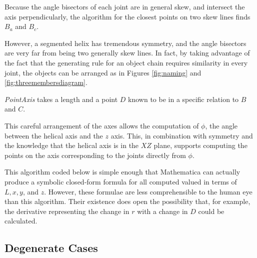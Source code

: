 \documentclass[11pt]{article}
\begin{document}
{Because the angle bisectors of each joint are in general skew, and intersect the
axis perpendicularly, the algorithm
for the closest points on two skew lines finds $B_a$ and $B_c$.

However, a segmented helix has
tremendous symmetry, and the angle bisectors are very far from being two
generally skew lines. In fact, by taking advantage of the fact that the
generating rule for an object chain requires similarity in every joint,
the objects can be arranged as in Figures \ref{fig:naming} and \ref{fig:threemembersdiagram}.

{\em PointAxis} takes a length and a point $D$ known to be in
a specific relation to $B$ and $C$.

This careful arrangement of the axes
allows the computation of $\phi$, the angle between the helical axis
and the $z$ axis. This, in combination with symmetry and the knowledge
that the helical axis is in the $XZ$ plane, supports computing the
points on the axis corresponding to the joints directly from $\phi$.

This algorithm coded below is simple enough that Mathematica\cite{Mathematica} can
actually produce a symbolic closed-form formula for all computed valued
in terms of $L, x, y$, and $z$.
However, these formulae are less comprehensible to the
human eye than this algorithm.
Their existence does open
the possibility that, for example, the derivative representing
the change in $r$ with a change in $D$ could be calculated.

\subsection{Degenerate Cases}

}
\end{document}
